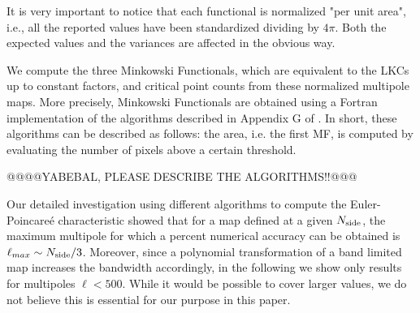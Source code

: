 \documentclass[aps,prd,showpacs,superscriptaddress,groupedaddress]{revtex4-1}  %
\begin{document}
It is very important to notice that each functional is normalized "per unit area", i.e., all the reported values have been standardized dividing by $4\pi$. Both the expected values and the variances are affected in the obvious way.

We compute  the three Minkowski Functionals, which are equivalent to the LKCs up to constant factors, and critical point counts from these normalized multipole maps.  More precisely, Minkowski Functionals are obtained using a Fortran implementation of the algorithms described in Appendix G of \cite{Gay2012_NGPeaks}. In short, these algorithms can be described
as follows: the area, i.e. the first MF, is computed by evaluating
the number of pixels above a certain threshold. 

@@@@YABEBAL, PLEASE DESCRIBE THE ALGORITHMS!!@@@




Our detailed investigation using different algorithms to compute the
Euler-Poincare\'{e} characteristic showed that for a map defined at a
given $N_{\rm side}$, the maximum multipole for which a percent
numerical accuracy can be obtained is $\ell_{max} \sim N_{\rm
  side}/3$. Moreover, since a polynomial transformation of a band
limited map increases the bandwidth accordingly, in the following we
show only results for multipoles $\ell<500$. While it would be
possible to cover larger values, we do not believe this is
essential for our purpose in this paper.
\end{document}
